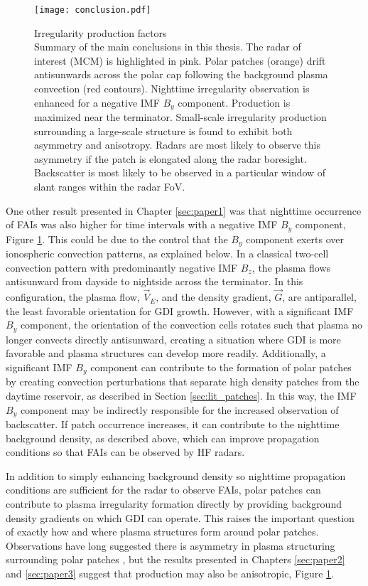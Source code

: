 \begin{figure}
  \texttt{[image: conclusion.pdf]}
  \caption[Irregularity production factors]{{\:}Irregularity production factors\\ Summary of the main conclusions in this thesis.  The radar of interest (MCM) is highlighted in pink.  Polar patches (orange) drift antisunwards across the polar cap following the background plasma convection (red contours).  Nighttime irregularity observation is enhanced for a negative IMF \(B_y\) component.  Production is maximized near the terminator.  Small-scale irregularity production surrounding a large-scale structure is found to exhibit both asymmetry and anisotropy.  Radars are most likely to observe this asymmetry if the patch is elongated along the radar boresight.  Backscatter is most likely to be observed in a particular window of slant ranges within the radar FoV.}
  \label{fig:conclusion}
\end{figure}

One other result presented in Chapter \ref{sec:paper1} was that nighttime occurrence of FAIs was also higher for time intervals with a negative IMF \(B_y\) component, Figure \ref{fig:conclusion}.  This could be due to the control that the \(B_y\) component exerts over ionospheric convection patterns, as explained below.  In a classical two-cell convection pattern with predominantly negative IMF \(B_z\), the plasma flows antisunward from dayside to nightside across the terminator.  In this configuration, the plasma flow, \(\vec{V}_E\), and the density gradient, \(\vec{G}\), are antiparallel, the least favorable orientation for GDI growth.  However, with a significant IMF \(B_y\) component, the orientation of the convection cells rotates such that plasma no longer convects directly antisunward, creating a situation where GDI is more favorable and plasma structures can develop more readily.  Additionally, a significant IMF \(B_y\) component can contribute to the formation of polar patches by creating convection perturbations that separate high density patches from the daytime reservoir, as described in Section \ref{sec:lit_patches}.  In this way, the IMF \(B_y\) component may be indirectly responsible for the increased observation of backscatter.  If patch occurrence increases, it can contribute to the nighttime background density, as described above, which can improve propagation conditions so that FAIs can be observed by 
HF radars.

In addition to simply enhancing background density so nighttime propagation conditions are sufficient for the radar to observe FAIs, polar patches can contribute to plasma irregularity formation directly by providing background density gradients on which GDI can operate.  This raises the important question of exactly how and where plasma structures form around polar patches.  Observations have long suggested there is asymmetry in plasma structuring surrounding polar patches \citep{Weber1984,Milan2002b,Koustov2012}, but the results presented in Chapters \ref{sec:paper2} and \ref{sec:paper3} suggest that production may also be anisotropic, Figure \ref{fig:conclusion}.  

